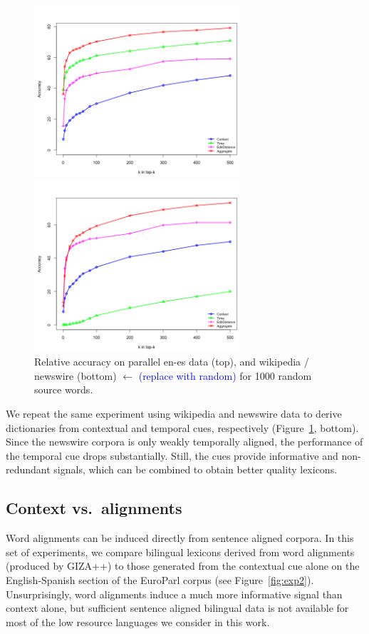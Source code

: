 \documentclass{article}
\newcommand{\todo}[1]{\textcolor{blue}{(#1)}}
\newcommand{\figref}[1]{Figure~\ref{#1}}
\begin{document}
\begin{figure}[h!]
\centerline{\mbox{\includegraphics[width=3in]{figures/exp1/parallel.rand/parallel}}}
\centerline{\mbox{\includegraphics[width=3in]{figures/exp1/wikinews.rand/wikinews}}}
\caption{Relative accuracy on parallel en-es data (top), and wikipedia / newswire (bottom) $\leftarrow$ \todo{replace with random} for 1000 random source words.}
\label{fig:exp1}
\end{figure}

We repeat the same experiment using wikipedia and newswire data to derive dictionaries from contextual and temporal cues, respectively (\figref{fig:exp1}, bottom).  Since the newswire corpora is only weakly temporally aligned, the performance of the temporal cue drops substantially.  Still, the cues provide informative and non-redundant signals, which can be combined to obtain better quality lexicons.

\subsection{Context vs.\ alignments} 

Word alignments can be induced directly from sentence aligned corpora.  In this set of experiments, we compare bilingual lexicons derived from word alignments (produced by GIZA++) to those generated from the contextual cue alone on the English-Spanish section of the EuroParl corpus (see \figref{fig:exp2}).  Unsurprisingly, word alignments induce a much more informative signal than context alone, but sufficient sentence aligned bilingual data is not available for most of the low resource languages we consider in this work.\\
\end{document}
